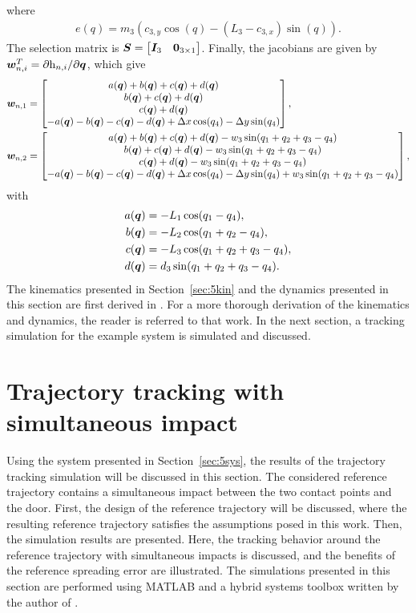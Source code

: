 \documentclass[../DC2019003Bouma.tex]{subfiles}
\begin{document}
where
\begin{align*}
e(q) = m_3\left(c_{3,y}\cos(q) - (L_3-c_{3,x})\sin(q)\right).
\end{align*}
The selection matrix is ${\boldsymbol{S}} = \begin{bmatrix}{\boldsymbol{I}}_3 & {\boldsymbol{0}}_{3 \times 1}\end{bmatrix}$. Finally, the jacobians are given by ${\boldsymbol{w}}_{n,i}^T = \partial \mathrm{h}_{n,i}/\partial{\boldsymbol{q}}$, which give
\begin{align}
{\boldsymbol{w}}_{n,1} &= \begin{bmatrix}
a({\boldsymbol{q}}) + b({\boldsymbol{q}}) + c({\boldsymbol{q}}) + d({\boldsymbol{q}})\\
b({\boldsymbol{q}}) + c({\boldsymbol{q}}) + d({\boldsymbol{q}})\\
c({\boldsymbol{q}}) + d({\boldsymbol{q}})\\
-a({\boldsymbol{q}}) - b({\boldsymbol{q}}) - c({\boldsymbol{q}}) - d({\boldsymbol{q}}) + \Delta x\cos(q_4) - \Delta y\sin(q_4)
\end{bmatrix},\\
{\boldsymbol{w}}_{n,2} &= \begin{bmatrix}
a({\boldsymbol{q}}) + b({\boldsymbol{q}}) + c({\boldsymbol{q}}) + d({\boldsymbol{q}})-w_3\sin(q_1+q_2+q_3-q_4)\\
b({\boldsymbol{q}}) + c({\boldsymbol{q}}) + d({\boldsymbol{q}})-w_3\sin(q_1+q_2+q_3-q_4)\\
c({\boldsymbol{q}}) + d({\boldsymbol{q}})-w_3\sin(q_1+q_2+q_3-q_4)\\
-a({\boldsymbol{q}}) - b({\boldsymbol{q}}) - c({\boldsymbol{q}}) - d({\boldsymbol{q}}) + \Delta x\cos(q_4) - \Delta y\sin(q_4)+w_3\sin(q_1+q_2+q_3-q_4)
\end{bmatrix},
\end{align}
with
\begin{align*}
a({\boldsymbol{q}}) &= -L_1\cos(q_1-q_4),\\
b({\boldsymbol{q}}) &= -L_2\cos(q_1+q_2-q_4),\\
c({\boldsymbol{q}}) &= -L_3\cos(q_1+q_2+q_3-q_4),\\
d({\boldsymbol{q}}) &= d_3\sin(q_1+q_2+q_3-q_4).
\end{align*}
The kinematics presented in Section~\ref{sec:5kin} and the dynamics presented in this section are first derived in \cite{Rijnen2018b}. For a more thorough derivation of the kinematics and dynamics, the reader is referred to that work. In the next section, a tracking simulation for the example system is simulated and discussed. 
\section{Trajectory tracking with simultaneous impact}\label{sec:5track}
Using the system presented in Section~\ref{sec:5sys}, the results of the trajectory tracking simulation will be discussed in this section. The considered reference trajectory contains a simultaneous impact between the two contact points and the door. First, the design of the reference trajectory will be discussed, where the resulting reference trajectory satisfies the assumptions posed in this work. Then, the simulation results are presented. Here, the tracking behavior around the reference trajectory with simultaneous impacts is discussed, and the benefits of the reference spreading error are illustrated. The simulations presented in this section are performed using MATLAB and a hybrid systems toolbox written by the author of \cite{Rijnen2018a}.
\end{document}
